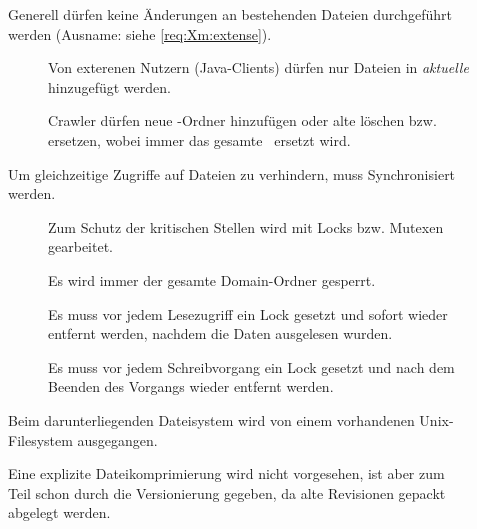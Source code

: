 \begin{description}
	\item []
		Generell dürfen keine Änderungen an bestehenden Dateien durchgeführt werden 
		(Ausname: siehe \ref{req:Xm:extense}).
		\begin{description}
			\item []
				Von exterenen Nutzern (Java-Clients) dürfen nur Dateien in \emph{aktuelle} \arc
				hinzugefügt werden.
			\item []
				Crawler dürfen neue \arc-Ordner hinzufügen oder alte löschen bzw. ersetzen, 
				wobei immer das gesamte \arc\ ersetzt wird. 
		\end{description}
	\item []
		Um gleichzeitige Zugriffe auf Dateien zu verhindern, 
		muss Synchronisiert werden.
		\begin{description}
			\item []
				Zum Schutz der kritischen Stellen wird mit Locks bzw. Mutexen gearbeitet.
			\item []
				Es wird immer der gesamte Domain-Ordner gesperrt.
			\item []
				Es muss vor jedem Lesezugriff ein Lock gesetzt und
				sofort wieder entfernt werden, nachdem die Daten ausgelesen wurden.
			\item []
				Es muss vor jedem Schreibvorgang ein Lock gesetzt und
				nach dem Beenden des Vorgangs wieder entfernt werden.
		\end{description}
	\item []
		Beim darunterliegenden Dateisystem wird von einem vorhandenen Unix-Filesystem ausgegangen.
	\item []
		Eine explizite Dateikomprimierung wird nicht vorgesehen, 
		ist aber zum Teil schon durch die Versionierung gegeben, 
		da alte Revisionen gepackt abgelegt werden.
\end{description}

